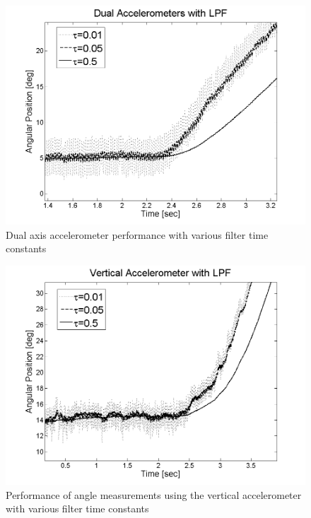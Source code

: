 \documentclass{article}
\theoremstyle{plain}
\theoremstyle{definition}
\theoremstyle{remark}
\begin{document}
\begin{figure}
\begin{center}
\includegraphics[width = 12cm]{Dual_LPF_TimeConstant.png}
\caption{Dual axis accelerometer performance with various filter time constants}
\end{center}
\end{figure}

\begin{figure}
\begin{center}
\includegraphics[width = 12cm]{Y_Vertical_LPF_TimeConstant.png}
\caption{Performance of angle measurements using the vertical accelerometer with various filter time constants}
\end{center}
\end{figure}
\end{document}
